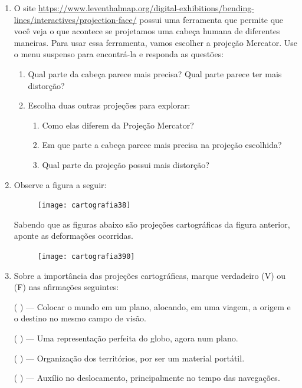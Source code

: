 \begin{enumerate}

\item O site \url{https://www.leventhalmap.org/digital-exhibitions/bending-lines/interactives/projection-face/} possui uma ferramenta que permite que você veja o que acontece se projetamos uma cabeça humana de diferentes maneiras.  Para usar essa ferramenta, vamos escolher a projeção Mercator. Use o menu suspenso para encontrá-la e responda as questões:
\begin{enumerate}
\item Qual parte da cabeça parece mais precisa? Qual parte parece ter mais distorção?
\item Escolha duas outras projeções para explorar:
\begin{enumerate}
\item Como elas diferem da Projeção Mercator?
\item Em que parte  a cabeça parece mais precisa na projeção escolhida?
\item  Qual parte da projeção possui mais distorção?
\end{enumerate}
\end{enumerate}

\clearpage


\item Observe a figura a seguir: 

\begin{figure}[H]
\centering
\texttt{[image: cartografia38]}
\end{figure}

Sabendo que as figuras abaixo são projeções cartográficas da figura anterior, aponte as deformações ocorridas.

\begin{figure}[H]
\centering
\texttt{[image: cartografia390]}
\end{figure}


\item Sobre a importância das projeções cartográficas, marque verdadeiro (V) ou (F) nas afirmações seguintes:

({ }{ }{ }) --- Colocar o mundo em um plano, alocando, em uma viagem, a origem e o destino no mesmo campo de visão.

({ }{ }{ }) --- Uma representação perfeita do globo, agora num plano.

({ }{ }{ }) --- Organização dos territórios, por ser um material portátil.

({ }{ }{ }) --- Auxílio no deslocamento, principalmente no tempo das navegações.


\end{enumerate}
